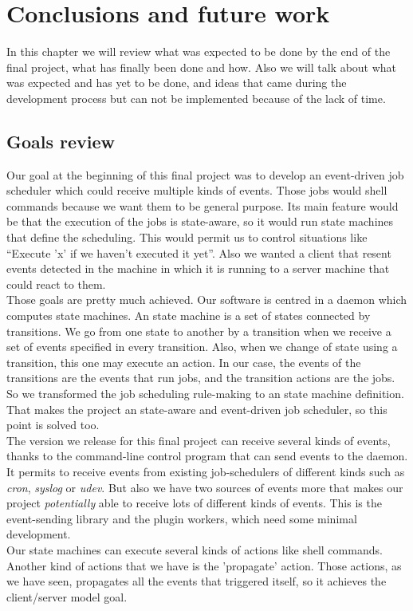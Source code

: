 \chapter{Conclusions and future work}
In this chapter we will review what was expected to be done by the end of the final project, what has finally been done and how. Also
we will talk about what was expected and has yet to be done, and ideas that came during the development process but can not be implemented
because of the lack of time.
\section{Goals review}
Our goal at the beginning of this final project was to develop an event-driven job scheduler which could receive multiple kinds of events.
Those jobs would shell commands because we want them to be general purpose.
Its main feature would be that the execution of the jobs is state-aware, so it would run state machines that define the scheduling.
This would permit us to control situations like ``Execute 'x' if we haven't executed it yet''. Also we wanted a client that resent events
detected in the machine in which it is running to a server machine that could react to them.\\
Those goals are pretty much achieved. Our software is centred in a daemon which computes state machines. An state machine is a set of 
states connected by transitions. We go from one state to another by a transition when we receive a set of events specified in 
every transition. Also, when we change of state using a transition, this one may execute an action. In our case, the 
events of the transitions are the events that run jobs, and the transition actions are the jobs. So we transformed the job scheduling
rule-making to an state machine definition. That makes the project an state-aware and event-driven job scheduler, so this point is solved too.\\
The version we release for this final project can receive several kinds of events, thanks to the command-line control program that can send
events to the daemon. It permits to receive events from existing job-schedulers of different kinds such as \emph{cron}, \emph{syslog} or
\emph{udev}. But also we have two sources of events more that makes our project \emph{potentially} able to receive lots of different kinds
of events. This is the event-sending library and the plugin workers, which need some minimal development.\\
Our state machines can execute several kinds of actions like shell commands. Another kind of actions that we have is the 'propagate' 
action. Those actions, as we have seen, propagates all the events that triggered itself, so it achieves the client/server model goal.
